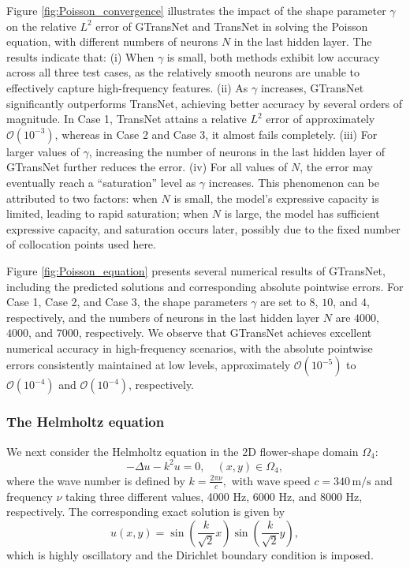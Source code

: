\documentclass{article}
\begin{document}
Figure \ref{fig:Poisson_convergence} illustrates the impact of the shape parameter $\gamma$ on the relative $L^2$ error of GTransNet and TransNet in solving the Poisson equation, with different numbers of neurons $N$ in the last hidden layer. The results indicate that:
(i) When $\gamma$ is small, both methods exhibit low accuracy across all three test cases, as the relatively smooth neurons are unable to effectively capture high-frequency features.
(ii) As $\gamma$ increases, GTransNet significantly outperforms TransNet, achieving better accuracy by several orders of magnitude. In Case 1, TransNet attains a relative $L^2$ error of approximately $\mathcal{O}(10^{-3})$, whereas in Case 2 and Case 3, it almost fails completely.
(iii) For larger values of $\gamma$, increasing the number of neurons in the last hidden layer of GTransNet further reduces the error.
(iv) For all values of $N$, the error may eventually reach a ``saturation'' level as $\gamma$ increases. This phenomenon can be attributed to two factors: when $N$ is small, the model’s expressive capacity is limited, leading to rapid saturation; when $N$ is large, the model has sufficient expressive capacity, and saturation occurs later, possibly due to the fixed number of collocation points used here.

Figure \ref{fig:Poisson_equation} presents several numerical results of GTransNet, including the predicted solutions and corresponding absolute pointwise errors. For Case 1, Case 2, and Case 3, the shape parameters $\gamma$ are set to $8$, $10$, and $4$, respectively, and the numbers of neurons in the last hidden layer $N$ are $4000$, $4000$, and $7000$, respectively. We observe that GTransNet achieves excellent numerical accuracy in high-frequency scenarios, with the absolute pointwise errors consistently maintained at low levels, approximately $\mathcal{O}(10^{-5})$ to $\mathcal{O}(10^{-4})$ and $\mathcal{O}(10^{-4})$, respectively.

\subsubsection{The Helmholtz equation}
We next consider the Helmholtz equation in the 2D flower-shape domain $\Omega_4$:
\begin{equation}\label{eq:Helmholtz}
        -\Delta u - k^2 u = 0, \quad (x, y) \in \Omega_4, 
\end{equation}
where the wave number is defined by
$
\textstyle k = \frac{2\pi \nu}{c},
$
with wave speed $c = 340\,\mathrm{m/s}$ and frequency $\nu$ taking three different values, 4000 Hz, 6000 Hz, and 8000 Hz, respectively. The corresponding exact solution is given by
\begin{equation}
    u(x, y) = \textstyle\sin\left(\frac{k}{\sqrt{2}}x\right)\sin\left(\frac{k}{\sqrt{2}}y\right),
\end{equation}
which is highly oscillatory and the Dirichlet boundary condition is imposed.
\end{document}
